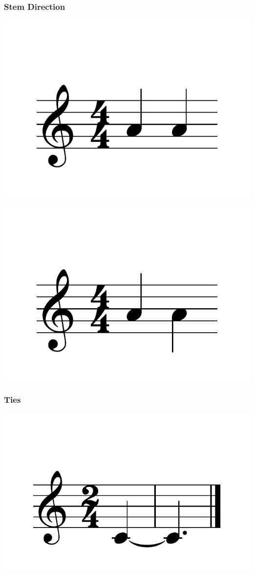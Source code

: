 \documentclass{article}
\begin{document}
\subsubsection{Stem Direction}
\includegraphics[scale=0.5]{figures_tests/pdf/skern/stemdirection0.pdf}

\includegraphics[scale=0.5]{figures_tests/pdf/skern/stemdirection1.pdf}

\subsubsection{Ties}
\includegraphics[scale=0.5]{figures_tests/pdf/skern/ties1.pdf}
\end{document}
